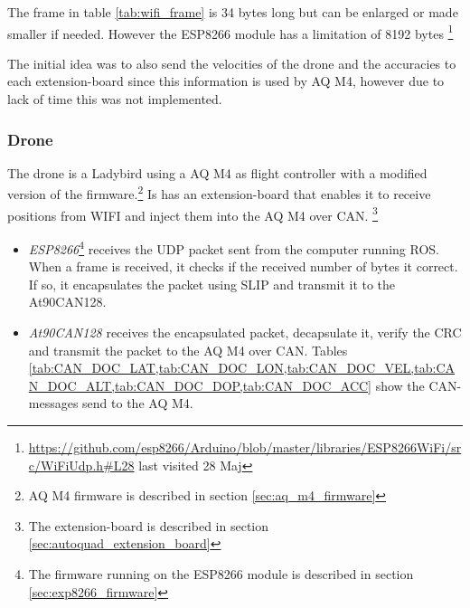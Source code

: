 The frame in table \ref{tab:wifi_frame} is 34 bytes long but can be enlarged or made smaller if needed. However the ESP8266 module has a limitation of 8192 bytes \footnote{\url{https://github.com/esp8266/Arduino/blob/master/libraries/ESP8266WiFi/src/WiFiUdp.h\#L28} last visited 28 Maj}

The initial idea was to also send the velocities of the drone and the accuracies to each extension-board since this information is used by AQ M4, however due to lack of time this was not implemented.

\subsubsection*{Drone}
The drone is a Ladybird using a \ac{AQ} M4 as flight controller with a modified version of the firmware.\footnote{AQ M4 firmware is described in section \ref{sec:aq_m4_firmware}} Is has an extension-board that enables it to receive positions from WIFI and inject them into the \ac{AQ} M4 over \ac{CAN}. \footnote{The extension-board is described in section \ref{sec:autoquad_extension_board}}
\begin{itemize}
	\item \textit{ESP8266}\footnote{The firmware running on the ESP8266 module is described in section \ref{sec:exp8266_firmware}} receives the UDP packet sent from the computer running \ac{ROS}. When a frame is received, it checks if the received number of bytes it correct. If so, it encapsulates the packet using \ac{SLIP} and transmit it to the At90CAN128.
	\item \textit{At90CAN128} receives the encapsulated packet, decapsulate it, verify the CRC and transmit the packet to the \ac{AQ} M4 over \ac{CAN}. Tables \cref{tab:CAN_DOC_LAT,tab:CAN_DOC_LON,tab:CAN_DOC_VEL,tab:CAN_DOC_ALT,tab:CAN_DOC_DOP,tab:CAN_DOC_ACC} show the CAN-messages send to the \ac{AQ} M4.
\end{itemize}


